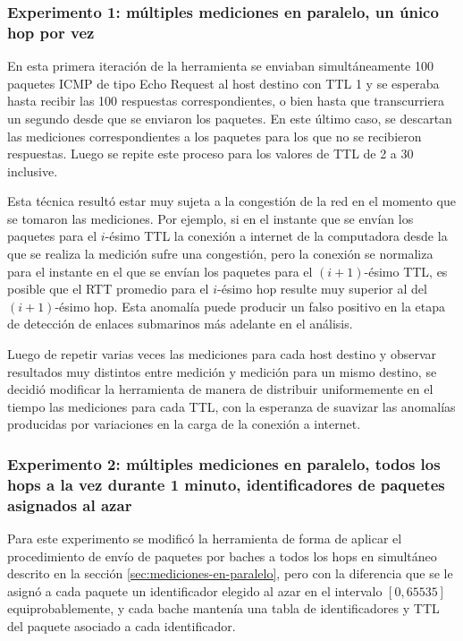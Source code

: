 \documentclass[a4paper, 10pt, twoside]{article}
\begin{document}
\subsubsection{Experimento 1: múltiples mediciones en paralelo, un único hop por vez}

En esta primera iteración de la herramienta se enviaban simultáneamente 100 paquetes ICMP de tipo Echo Request al host destino con TTL 1 y se esperaba hasta recibir las 100 respuestas correspondientes, o bien hasta que transcurriera un segundo desde que se enviaron los paquetes. En este último caso, se descartan las mediciones correspondientes a los paquetes para los que no se recibieron respuestas. Luego se repite este proceso para los valores de TTL de 2 a 30 inclusive.

Esta técnica resultó estar muy sujeta a la congestión de la red en el momento que se tomaron las mediciones. Por ejemplo, si en el instante que se envían los paquetes para el $i$-ésimo TTL la conexión a internet de la computadora desde la que se realiza la medición sufre una congestión, pero la conexión se normaliza para el instante en el que se envían los paquetes para el $(i+1)$-ésimo TTL, es posible que el RTT promedio para el $i$-ésimo hop resulte muy superior al del $(i+1)$-ésimo hop. Esta anomalía puede producir un falso positivo en la etapa de detección de enlaces submarinos más adelante en el análisis.

Luego de repetir varias veces las mediciones para cada host destino y observar resultados muy distintos entre medición y medición para un mismo destino, se decidió modificar la herramienta de manera de distribuir uniformemente en el tiempo las mediciones para cada TTL, con la esperanza de suavizar las anomalías producidas por variaciones en la carga de la conexión a internet.


\subsubsection{Experimento 2: múltiples mediciones en paralelo, todos los hops a la vez durante 1 minuto, identificadores de paquetes asignados al azar}

Para este experimento se modificó la herramienta de forma de aplicar el procedimiento de envío de paquetes por baches a todos los hops en simultáneo descrito en la sección \ref{sec:mediciones-en-paralelo}, pero con la diferencia que se le asignó a cada paquete un identificador elegido al azar en el intervalo $[0, 65535]$ equiprobablemente, y cada bache mantenía una tabla de identificadores y TTL del paquete asociado a cada identificador.
\end{document}
